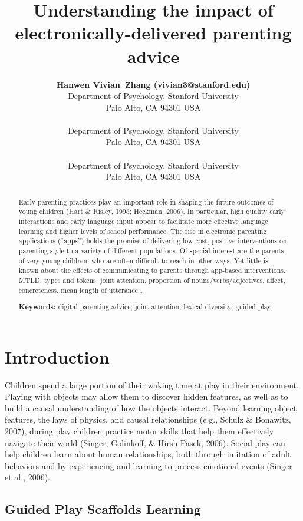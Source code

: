 \documentclass[10pt, letterpaper]{article}
\title{Understanding the impact of electronically-delivered parenting advice}
\author{{\large \bf Hanwen Vivian~Zhang (vivian3@stanford.edu)} \\ Department of Psychology, Stanford University \\ Palo Alto, CA 94301 USA \AND {\large \bf George~Kachergis (george.kachergis@gmail.com)} \\ \\ Department of Psychology, Stanford University \\ Palo Alto, CA 94301 USA \AND {\large \bf Michael C.~Frank (mcfrank@stanford.edu)} \\ \\ Department of Psychology, Stanford University \\ Palo Alto, CA 94301 USA}
\begin{document}
\maketitle

\begin{abstract}
Early parenting practices play an important role in shaping the future
outcomes of young children (Hart \& Risley, 1995; Heckman, 2006). In
particular, high quality early interactions and early language input
appear to facilitate more effective language learning and higher levels
of school performance. The rise in electronic parenting applications
(``apps'') holds the promise of delivering low-cost, positive
interventions on parenting style to a variety of different populations.
Of special interest are the parents of very young children, who are
often difficult to reach in other ways. Yet little is known about the
effects of communicating to parents through app-based interventions.
MTLD, types and tokens, joint attention, proportion of
nouns/verbs/adjectives, affect, concreteness, mean length of
utterance\ldots{}

\textbf{Keywords:}
digital parenting advice; joint attention; lexical diversity; guided
play;
\end{abstract}

\section{Introduction}\label{introduction}

Children spend a large portion of their waking time at play in their
environment. Playing with objects may allow them to discover hidden
features, as well as to build a causal understanding of how the objects
interact. Beyond learning object features, the laws of physics, and
causal relationships (e.g., Schulz \& Bonawitz, 2007), during play
children practice motor skills that help them effectively navigate their
world (Singer, Golinkoff, \& Hirsh-Pasek, 2006). Social play can help
children learn about human relationships, both through imitation of
adult behaviors and by experiencing and learning to process emotional
events (Singer et al., 2006).

\subsection{Guided Play Scaffolds
Learning}\label{guided-play-scaffolds-learning}
\end{document}
